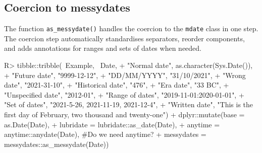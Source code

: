 \documentclass[
]{jss}
\begin{document}
\hypertarget{coercion-to-messydates}{%
\subsection{Coercion to messydates}\label{coercion-to-messydates}}

The function \texttt{as\_messydate()} handles the coercion to the
\texttt{mdate} class in one step. The coercion step automatically
standardises separators, reorder components, and adds annotations for
ranges and sets of dates when needed.

\begin{CodeChunk}
\begin{CodeInput}
R> tibble::tribble(~Example, ~Date,
+                 "Normal date", as.character(Sys.Date()),
+                 "Future date", "9999-12-12",
+                 "DD/MM/YYYY", "31/10/2021",
+                 "Wrong date", "2021-31-10",
+                 "Historical date", "476",
+                 "Era date", "33 BC",
+                 "Unspecified date", "2012-01",
+                 "Range of dates", "2019-11-01:2020-01-01",
+                 "Set of dates", "2021-5-26, 2021-11-19, 2021-12-4",
+                 "Written date", "This is the first day of February, two thousand and twenty-one") %
+   dplyr::mutate(base = as.Date(Date),
+                 lubridate = lubridate::as_date(Date),
+                 anytime = anytime::anydate(Date), #Do we need anytime?
+                 messydates = messydates::as_messydate(Date))
\end{CodeInput}
\begin{CodeOutput}
# A tibble: 10 x 6
   Example          Date                base       lubridate  anytime    messy~1
   <chr>            <chr>               <date>     <date>     <date>     <mdate>
 1 Normal date      2023-01-09          2023-01-09 2023-01-09 2023-01-09 2023-0~
 2 Future date      9999-12-12          9999-12-12 9999-12-12 9999-12-12 9999-1~
 3 DD/MM/YYYY       31/10/2021          NA         NA         NA         2021-1~
 4 Wrong date       2021-31-10          NA         NA         NA         2021-1~
 5 Historical date  476                 NA         NA         NA         0476  ~
 6 Era date         33 BC               NA         NA         NA         -0033 ~
 7 Unspecified date 2012-01             NA         2020-12-01 2012-01-01 2012-0~
 8 Range of dates   2019-11-01:2020-01~ 2019-11-01 2019-11-01 2019-11-01 2019-1~
 9 Set of dates     2021-5-26, 2021-11~ 2021-05-26 NA         2021-05-26 {2021-~
10 Written date     This is the first ~ NA         NA         NA         2021-0~
# ... with abbreviated variable name 1: messydates
\end{CodeOutput}
\end{CodeChunk}
\end{document}
